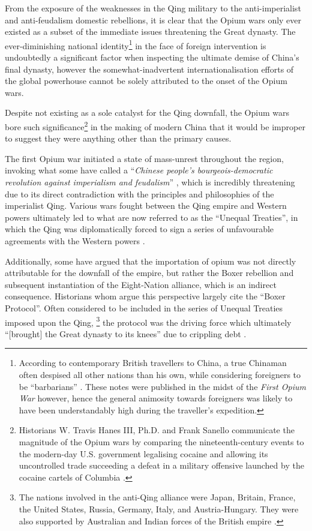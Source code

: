 \documentclass{article}
\begin{document}
From the exposure of the weaknesses in the Qing military to the anti-imperialist and anti-feudalism domestic rebellions, it is clear that the Opium wars only ever existed as a subset of the immediate issues threatening the Great dynasty. The ever-diminishing national identity\footnote{According to contemporary British travellers to China, a true Chinaman often despised all other nations than his own, while considering foreigners to be ``barbarians''
\autocite{McPherson:1842}. These notes were published in the midst of the \textit{First Opium War} however, hence the general animosity towards foreigners was likely to have been understandably high during the traveller's expedition.} in the face of foreign intervention is undoubtedly a significant factor when inspecting the ultimate demise of China's final dynasty, however the somewhat-inadvertent internationalisation efforts of the global powerhouse cannot be solely attributed to the onset of the Opium wars.

Despite not existing as a sole catalyst for the Qing downfall, the Opium wars bore such significance\footnote{Historians W. Travis Hanes III, Ph.D. and Frank Sanello communicate the magnitude of the Opium wars by comparing the nineteenth-century events to the modern-day U.S. government legalising cocaine and allowing its uncontrolled trade succeeding a defeat in a military offensive launched by the cocaine cartels of Columbia
\autocite{Hanes:2004}.} in the making of modern China that it would be improper to suggest they were anything other than the primary causes.

The first Opium war initiated a state of mass-unrest throughout the region, invoking what some have called a ``\textit{Chinese people's bourgeois-democratic revolution against imperialism and feudalism}''
\autocite{Janin:1999}, which is incredibly threatening due to its direct contradiction with the principles and philosophies of the imperialist Qing. Various wars fought between the Qing empire and Western powers ultimately led to what are now referred to as the ``Unequal Treaties'', in which the Qing was diplomatically forced to sign a series of unfavourable agreements with the Western powers \autocite{Wang:2005}.

Additionally, some have argued that the importation of opium was not directly attributable for the downfall of the empire, but rather the Boxer rebellion and subsequent instantiation of the Eight-Nation alliance, which is an indirect consequence. Historians whom argue this perspective largely cite the ``Boxer Protocol''. Often considered to be included in the series of Unequal Treaties imposed upon the Qing, \footnote{The nations involved in the anti-Qing alliance were Japan, Britain, France, the United States, Russia, Germany, Italy, and Austria-Hungary. They were also supported by Australian and Indian forces of the British empire
\autocite{Gardener:2016}.} the protocol was the driving force which ultimately ``[brought] the Great dynasty to its knees'' due to crippling debt \autocite{Mitchell:2008}.
\end{document}
